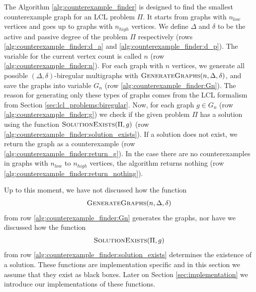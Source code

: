 The Algorithm \ref{alg:counterexample_finder} is designed to find the smallest counterexample graph for an LCL problem $\Pi$.
It starts from graphs with $n_{low}$ vertices and goes up to graphs with $n_{high}$ vertices.
We define $\Delta$ and $\delta$ to be the active and passive degree of the problem $\Pi$ respectively (rows \ref{alg:counterexample_finder:d_a} and \ref{alg:counterexample_finder:d_p}).
The variable for the current vertex count is called $n$ (row \ref{alg:counterexample_finder:n}).
For each graph with $n$ vertices, we generate all possible $(\Delta, \delta)$-biregular multigraphs with $\textsc{GenerateGraphs}(n, \Delta, \delta)$, and save the graphs into variable $G_n$ (row \ref{alg:counterexample_finder:Gn}).
The reason for generating only these types of graphs comes from the LCL formalism from Section \ref{sec:lcl_problems:biregular}.
Now, for each graph $g \in G_n$ (row \ref{alg:counterexample_finder:g}) we check if the given problem $\Pi$ has a solution using the function $\textsc{SolutionExists}(\Pi, g)$ (row \ref{alg:counterexample_finder:solution_exists}).
If a solution does not exist, we return the graph as a counterexample (row \ref{alg:counterexample_finder:return_g}).
In the case there are no counterexamples in graphs with $n_{low}$ to $n_{high}$ vertices, the algorithm returns nothing (row \ref{alg:counterexample_finder:return_nothing}).

Up to this moment, we have not discussed how the function \[ \textsc{GenerateGraphs}(n, \Delta, \delta) \] from row \ref{alg:counterexample_finder:Gn} generates the graphs, nor have we discussed how the function \[ \textsc{SolutionExists}(\Pi, g) \] from row \ref{alg:counterexample_finder:solution_exists} determines the existence of a solution.
These functions are implementation specific and in this section we assume that they exist as black boxes.
Later on Section \ref{sec:implementation} we introduce our implementations of these functions.

